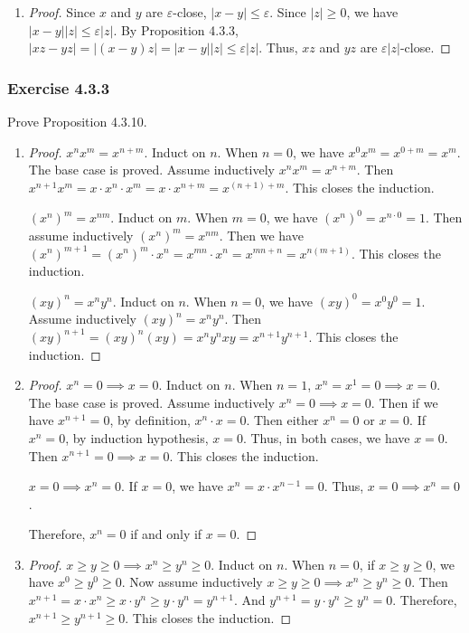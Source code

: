 \documentclass[12pt, letter]{article}
\newcommand{\ec}{$\varepsilon$-close }
\newcommand{\ssc}{\subsubsection* }
\newcommand{\E}{Exercise }
\begin{document}
\begin{enumerate}[label=(\alph*)]
\begin{proof}
        $x\leq y$. Since $z$ is \ec to $x$, $|z-x|=z-x\leq \varepsilon$. Then $|w-x|=w-x\leq z-x=|z-x|\leq\varepsilon$. So $w$ is \ec to $x$.

        $y\leq x\leq z$. We have $|w-x|\leq\max(|z-x|,|x-y|)\leq\varepsilon$. So $w$ is \ec to $x$.
    \end{proof}
    \item \begin{proof}
        Since $x$ and $y$ are $\varepsilon$-close, $|x-y|\leq\varepsilon$. Since $|z|\geq 0$, we have $|x-y||z|\leq\varepsilon|z|$. By Proposition 4.3.3, $|xz-yz|=
        |(x-y)z|=|x-y||z|\leq\varepsilon|z|$. Thus, $xz$ and $yz$ are $\varepsilon|z|$-close.
    \end{proof}
\end{enumerate}
\ssc{\E 4.3.3}
Prove Proposition 4.3.10.
\begin{enumerate}[label=(\alph*)]
    \item \begin{proof}
        $x^n x^m=x^{n+m}$. Induct on $n$. When $n=0$, we have $x^0x^m=x^{0+m}=x^m$. The base case is proved. Assume inductively $x^n x^m=x^{n+m}$. 
        Then $x^{n+1}x^m=x\cdot x^n\cdot x^m=x\cdot x^{n+m}=x^{(n+1)+m}$. This closes the induction.

        $(x^n)^m=x^{nm}$. Induct on $m$. When $m=0$, we have $(x^n)^0=x^{n\cdot 0}=1$. Then assume inductively $(x^n)^m=x^{nm}$. Then we have
        $(x^n)^{m+1}=(x^n)^m\cdot x^n=x^{mn}\cdot x^n=x^{mn+n}=x^{n(m+1)}$. This closes the induction.

        $(xy)^n=x^n y^n$. Induct on $n$. When $n=0$, we have $(xy)^0=x^0 y^0=1$. Assume inductively $(xy)^n=x^n y^n$. Then $(xy)^{n+1}=(xy)^n(xy)=x^n y^n xy=
        x^{n+1}y^{n+1}$. This closes the induction.
    \end{proof}
    \item \begin{proof}
        $x^n=0\implies x=0$. Induct on $n$. When $n=1$, $x^n=x^1=0\implies x=0$. The base case is proved. Assume inductively $x^n=0\implies x=0$. Then 
        if we have $x^{n+1}=0$, by definition, $x^n\cdot x=0$. Then either $x^n=0$ or $x=0$. If $x^n=0$, by induction hypothesis, $x=0$. Thus, in both cases, we have $x=0$.
        Then $x^{n+1}=0\implies x=0$. This closes the induction.

        $x=0\implies x^n=0$. If $x=0$, we have $x^n=x\cdot x^{n-1}=0$. Thus, $x=0\implies x^n=0$.

        Therefore, $x^n=0$ if and only if $x=0$.
    \end{proof}
    \item \begin{proof}
        $x\geq y\geq 0\implies x^n\geq y^n\geq 0$. Induct on $n$. When $n=0$, if $x\geq y\geq 0$, we have $x^0\geq y^0\geq 0$. Now assume inductively 
        $x\geq y\geq 0\implies x^n\geq y^n\geq 0$. Then $x^{n+1}=x\cdot x^n\geq x\cdot y^n\geq y\cdot y^n=y^{n+1}$. And $y^{n+1}=y\cdot y^n\geq y^n=0$.
        Therefore, $x^{n+1}\geq y^{n+1}\geq 0$. This closes the induction.


\end{proof}
\end{enumerate}
\end{document}
